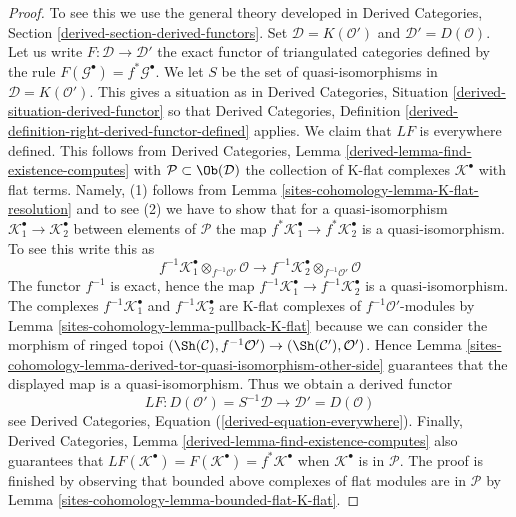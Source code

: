 \begin{proof}
To see this we use the general theory developed in
Derived Categories, Section \ref{derived-section-derived-functors}.
Set $\mathcal{D} = K(\mathcal{O}')$ and $\mathcal{D}' = D(\mathcal{O})$.
Let us write $F : \mathcal{D} \to \mathcal{D}'$ the exact functor
of triangulated categories defined by the rule
$F(\mathcal{G}^\bullet) = f^*\mathcal{G}^\bullet$.
We let $S$ be the set of quasi-isomorphisms in
$\mathcal{D} = K(\mathcal{O}')$.
This gives a situation as in
Derived Categories, Situation \ref{derived-situation-derived-functor}
so that
Derived Categories, Definition
\ref{derived-definition-right-derived-functor-defined}
applies. We claim that $LF$ is everywhere defined.
This follows from
Derived Categories, Lemma \ref{derived-lemma-find-existence-computes}
with $\mathcal{P} \subset \Ob(\mathcal{D})$ the collection
of K-flat complexes $\mathcal{K}^\bullet$ with flat terms.
Namely, (1) follows from Lemma \ref{sites-cohomology-lemma-K-flat-resolution}
and to see (2) we have to show that for a quasi-isomorphism
$\mathcal{K}_1^\bullet  \to \mathcal{K}_2^\bullet$ between
elements of $\mathcal{P}$ the map
$f^*\mathcal{K}_1^\bullet  \to f^*\mathcal{K}_2^\bullet$ is a
quasi-isomorphism. To see this write this as
$$
f^{-1}\mathcal{K}_1^\bullet \otimes_{f^{-1}\mathcal{O}'} \mathcal{O}
\longrightarrow
f^{-1}\mathcal{K}_2^\bullet \otimes_{f^{-1}\mathcal{O}'} \mathcal{O}
$$
The functor $f^{-1}$ is exact, hence the map
$f^{-1}\mathcal{K}_1^\bullet  \to f^{-1}\mathcal{K}_2^\bullet$ is a
quasi-isomorphism. The complexes
$f^{-1}\mathcal{K}_1^\bullet$ and $f^{-1}\mathcal{K}_2^\bullet$
are K-flat complexes of $f^{-1}\mathcal{O}'$-modules by
Lemma \ref{sites-cohomology-lemma-pullback-K-flat}
because we can consider the morphism of ringed topoi
$(\Sh(\mathcal{C}), f^{-1}\mathcal{O}') \to
(\Sh(\mathcal{C}'), \mathcal{O}')$. Hence
Lemma \ref{sites-cohomology-lemma-derived-tor-quasi-isomorphism-other-side}
guarantees that the displayed map is a quasi-isomorphism.
Thus we obtain a derived functor
$$
LF :
D(\mathcal{O}') = S^{-1}\mathcal{D}
\longrightarrow
\mathcal{D}' = D(\mathcal{O})
$$
see
Derived Categories, Equation (\ref{derived-equation-everywhere}).
Finally,
Derived Categories, Lemma \ref{derived-lemma-find-existence-computes}
also guarantees that
$LF(\mathcal{K}^\bullet) = F(\mathcal{K}^\bullet) = f^*\mathcal{K}^\bullet$
when $\mathcal{K}^\bullet$ is in $\mathcal{P}$.
The proof is finished by observing that
bounded above complexes of flat modules are in $\mathcal{P}$
by Lemma \ref{sites-cohomology-lemma-bounded-flat-K-flat}.
\end{proof}

